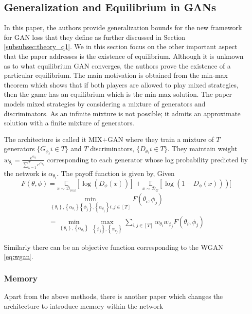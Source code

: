 \subsection*{Generalization and Equilibrium in GANs \citep{Arora03}} 
In this paper, the authors provide generalization bounds for the new framework for GAN loss that they define as further discussed in Section \ref{subsubsec:theory_q1}. 
We in this section focus on the other important aspect that the paper addresses is the existence of equilibrium. Although it is unknown as to what equilibrium GAN converges, the authors prove the existence of a particular equilibrium. The main motivation is obtained from the min-max theorem \citep{neumann1928} which shows that if both players are allowed to play mixed strategies, then the game has an equilibrium which is the min-max solution. The paper models mixed strategies by considering a mixture of generators and discriminators.  As an infinite mixture is not possible; it admits an approximate solution with a finite mixture of generators. 

The architecture is called it MIX$+$GAN where they train a mixture of $T$ generators $\{ G_{\phi_i} i \in T \}$ and $T$ discriminators, $\{ D_{\theta_i} i \in T \}$. They maintain weight  $w_{\theta_{i}}=\frac{e^{\alpha_{\theta_{i}}}}{\sum_{k=1}^{T} e^{\alpha_{\theta_{k}}}}$ corresponding to each generator whose log probability predicted by the network is $\alpha_{\theta_i} $. The payoff function is given by,
Given 
$$
F(\theta, \phi)=\underset{x \sim \mathcal{D}_{\text {real}}}{\mathbb{E}}\left[\log\left(D_{\phi}(x)\right)\right]+\underset{x \sim \mathcal{D}_{G}}{\mathbb{E}}\left[\log\left(1-D_{\phi}(x)\right)\right) ]
$$
\begin{equation}
\label{eq:mix-gan}
\begin{array}{l}{\min _{\left\{\theta_{i}\right\},\left\{\alpha_{\theta_{i}}\right\}\left\{\phi_{j}\right\},\left\{\alpha_{\phi_{j}}\right\} i, j \in[T]} F\left(\theta_{i}, \phi_{j}\right)} \\ {=\min _{\left\{\theta_{i}\right\},\left\{\alpha_{\theta_{i}}\right\}} \max _{\left\{\phi_{j}\right\},\left\{\alpha_{v_{j}}\right\}} \sum_{i, j \in[T]} w_{\theta_{i}} w_{\phi_{j}} F\left(\theta_{i}, \phi_{j}\right)}\end{array}
\end{equation}


Similarly there can be an objective function corresponding to the WGAN \ref{eq:wgan}.


\subsubsection{Memory}\label{subsubsec:arch_mem}
Apart from the above methods, there is another paper which changes the architecture to introduce memory within the network 

